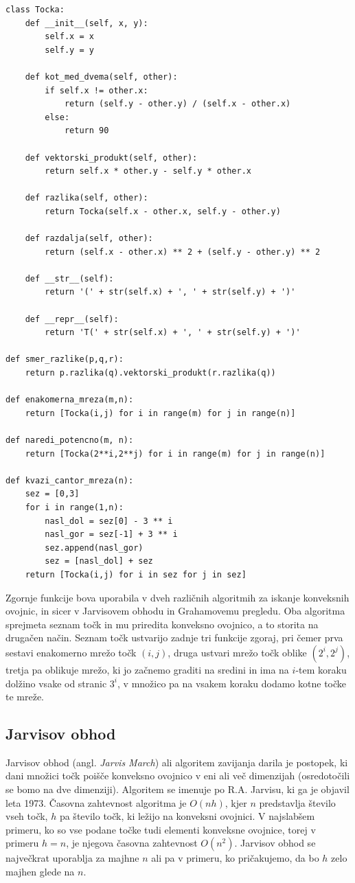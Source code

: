 \documentclass[a4paper]{article}
\begin{document}
\begin{lstlisting}
class Tocka:
    def __init__(self, x, y):
        self.x = x
        self.y = y

    def kot_med_dvema(self, other):
        if self.x != other.x:
            return (self.y - other.y) / (self.x - other.x)
        else:
            return 90

    def vektorski_produkt(self, other): 
        return self.x * other.y - self.y * other.x

    def razlika(self, other):
    	return Tocka(self.x - other.x, self.y - other.y)

    def razdalja(self, other):
        return (self.x - other.x) ** 2 + (self.y - other.y) ** 2

    def __str__(self):
        return '(' + str(self.x) + ', ' + str(self.y) + ')'

    def __repr__(self):
        return 'T(' + str(self.x) + ', ' + str(self.y) + ')'

def smer_razlike(p,q,r):
    return p.razlika(q).vektorski_produkt(r.razlika(q))

def enakomerna_mreza(m,n):
    return [Tocka(i,j) for i in range(m) for j in range(n)]

def naredi_potencno(m, n):
    return [Tocka(2**i,2**j) for i in range(m) for j in range(n)]

def kvazi_cantor_mreza(n):
    sez = [0,3]
    for i in range(1,n):
        nasl_dol = sez[0] - 3 ** i
        nasl_gor = sez[-1] + 3 ** i
        sez.append(nasl_gor)
        sez = [nasl_dol] + sez
    return [Tocka(i,j) for i in sez for j in sez]
\end{lstlisting}

Zgornje funkcije bova uporabila v dveh različnih algoritmih za iskanje konveksnih ovojnic, in sicer v Jarvisovem obhodu in Grahamovemu pregledu.
Oba algoritma sprejmeta seznam točk in mu priredita konveksno ovojnico, a to storita na drugačen način.
Seznam točk ustvarijo zadnje tri funkcije zgoraj, pri čemer prva sestavi enakomerno mrežo točk $(i, j)$, druga ustvari mrežo točk oblike $(2^i, 2^j)$, tretja pa oblikuje mrežo, ki
jo začnemo graditi na sredini in ima na $i$-tem koraku dolžino vsake od stranic $3^i$, v množico pa na vsakem koraku dodamo kotne točke te mreže.

\newpage
\subsection{Jarvisov obhod}
Jarvisov obhod (angl. \textit{Jarvis March}) ali algoritem zavijanja darila je postopek, ki dani množici točk poišče konveksno ovojnico v eni ali več dimenzijah (osredotočili se 
bomo na dve dimenziji). Algoritem se imenuje po R.A. Jarvisu, ki ga je objavil leta 1973. Časovna zahtevnost algoritma je $O(nh)$, kjer $n$ predstavlja število vseh točk, $h$ pa 
število točk, ki ležijo na konveksni ovojnici. V najslabšem primeru, ko so vse podane točke tudi elementi konveksne ovojnice, torej v primeru $h = n$, je njegova časovna zahtevnost 
$O(n^2)$. Jarvisov obhod se največkrat uporablja za majhne $n$ ali pa v primeru, ko pričakujemo, da bo $h$ zelo majhen glede na $n$.
\end{document}
